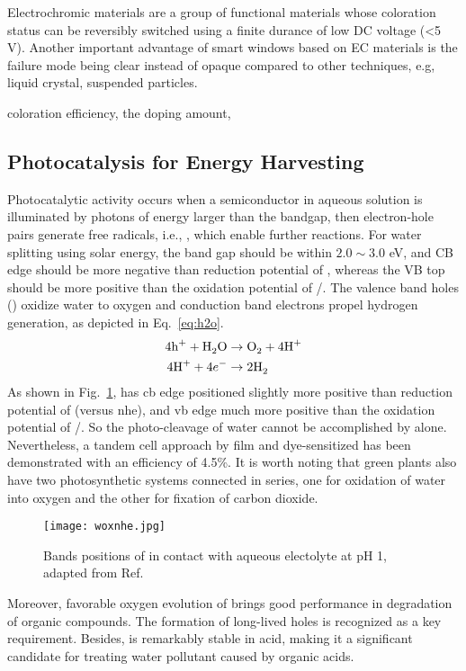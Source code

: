 Electrochromic materials are a group of functional materials whose coloration status can be reversibly switched using a finite durance of low DC voltage (\textless 5 V). Another important advantage of smart windows based on EC materials is the failure mode being clear instead of opaque compared to other techniques, e.g, liquid crystal, suspended particles. 

coloration efficiency, the doping amount, 
 

\subsection{Photocatalysis for Energy Harvesting}

Photocatalytic activity occurs when a semiconductor in aqueous solution is illuminated by photons of energy larger than the bandgap, then electron-hole pairs generate free radicals, i.e., , which enable further reactions. For water splitting using solar energy, the band gap should be within $2.0 \sim 3.0 $ eV, and CB edge should be more negative than reduction potential of , whereas the VB top should be more positive than the oxidation potential of /.\cite{Wang2012} The valence band holes () oxidize water to oxygen and conduction band electrons propel hydrogen generation, as depicted in Eq.~\ref{eq:h2o}.
\begin{subequations}\label{eq:h2o}
\begin{align}
4\ce{h^+} +  \ce{H2O} &\rightarrow \ce{O2} + 4\ce{H^+} \label{eq:hervb}\\
4\ce{H^+} +  4e^- &\rightarrow 2\ce{H2} \label{eq:hercb}
\end{align}
\end{subequations}
As shown in Fig.~\ref{fig:woxnhe},  has \gls{cb} edge positioned slightly more positive than reduction potential of (versus \gls{nhe}), and \gls{vb} edge much more positive than the oxidation potential of /. So the photo-cleavage of water cannot be accomplished by  alone. Nevertheless, a tandem cell approach by  film and dye-sensitized  has been demonstrated with an efficiency of 4.5\%.\cite{Michael1999} It is worth noting that green plants also have two photosynthetic systems connected in series, one for oxidation of water into oxygen and the other for fixation of carbon dioxide.
\begin{figure}[htb]
\centering
\texttt{[image: woxnhe.jpg]}
\caption[Bands positions of  versus NHE]{Bands positions of  in contact with aqueous electolyte at pH 1, adapted from Ref.\cite{Gratzel2001}}
\label{fig:woxnhe}
\end{figure}
Moreover, favorable oxygen evolution of  brings good performance in degradation of organic compounds\cite{Hepel2001,Luo2001,Watcharenwong2008}. The formation of long-lived holes is recognized as a key requirement.\cite{Pesci2011} Besides,  is remarkably stable in acid, making it a significant candidate for treating water pollutant caused by organic acids.\cite{Monllor-Satoca2006}

